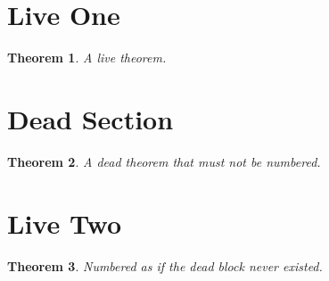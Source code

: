 \documentclass{article}
\newtheorem{thm}{Theorem}[section]
\begin{document}
\section{Live One}
\begin{thm}
A live theorem.
\end{thm}

\section{Dead Section}
\begin{thm}
A dead theorem that must not be numbered.
\end{thm}
\fi

\section{Live Two}
\begin{thm}
Numbered as if the dead block never existed.
\end{thm}
\end{document}
